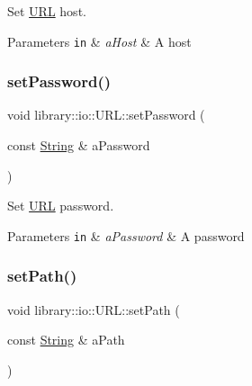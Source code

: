 Set \hyperlink{classlibrary_1_1io_1_1_u_r_l}{U\+RL} host. 


\begin{DoxyParams}[1]{Parameters}
\mbox{\tt in}  & {\em a\+Host} & A host \\
\hline
\end{DoxyParams}
\mbox{\label{classlibrary_1_1io_1_1_u_r_l_a43360d356d992c5357117cd93b4eab06}} 
\subsubsection{\texorpdfstring{set\+Password()}{setPassword()}}
{\footnotesize\ttfamily void library\+::io\+::\+U\+R\+L\+::set\+Password (\begin{DoxyParamCaption}\item[{const \hyperlink{namespacelibrary_1_1io_a7469b45835a4421045db344d6a5a1f85}{String} \&}]{a\+Password }\end{DoxyParamCaption})}



Set \hyperlink{classlibrary_1_1io_1_1_u_r_l}{U\+RL} password. 


\begin{DoxyParams}[1]{Parameters}
\mbox{\tt in}  & {\em a\+Password} & A password \\
\hline
\end{DoxyParams}
\mbox{\label{classlibrary_1_1io_1_1_u_r_l_ab7f4c0962a64eb3feb5b293c57f7f142}} 
\subsubsection{\texorpdfstring{set\+Path()}{setPath()}}
{\footnotesize\ttfamily void library\+::io\+::\+U\+R\+L\+::set\+Path (\begin{DoxyParamCaption}\item[{const \hyperlink{namespacelibrary_1_1io_a7469b45835a4421045db344d6a5a1f85}{String} \&}]{a\+Path }\end{DoxyParamCaption})}



